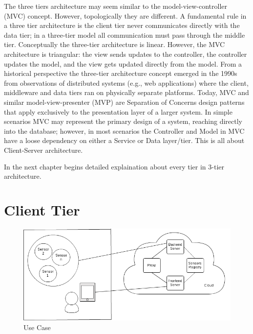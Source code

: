 \newline
The three tiers architecture may seem similar to the model-view-controller (MVC) concept. However, topologically they are different. A fundamental rule in a three tier architecture is the client tier never communicates directly with the data tier; in a three-tier model all communication must pass through the middle tier. Conceptually the three-tier architecture is linear. However, the MVC architecture is triangular: the view sends updates to the controller, the controller updates the model, and the view gets updated directly from the model.
From a historical perspective the three-tier architecture concept emerged in the 1990s from observations of distributed systems (e.g., web applications) where the client, middleware and data tiers ran on physically separate platforms. Today, MVC and similar model-view-presenter (MVP) are Separation of Concerns design patterns that apply exclusively to the presentation layer of a larger system. In simple scenarios MVC may represent the primary design of a system, reaching directly into the database; however, in most scenarios the Controller and Model in MVC have a loose dependency on either a Service or Data layer/tier. This is all about Client-Server architecture.

In the next chapter begins detailed explaination about every tier in 3-tier architecture.

\section{Client Tier}

\begin{figure}[!ht]
\centering
\includegraphics[scale=0.5]{images/User_Case.png}   
\caption[Use Case]{Use Case}
\label{img:structure}                           
\end{figure}
